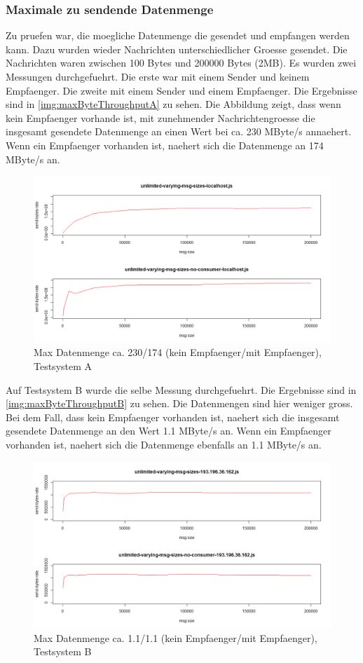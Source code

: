 \subsubsection{Maximale zu sendende Datenmenge}
\label{sec:maxthroughput}
Zu pruefen war, die moegliche Datenmenge die gesendet und empfangen werden kann. Dazu wurden wieder Nachrichten unterschiedlicher Groesse gesendet. Die Nachrichten waren zwischen 100 Bytes und 200000 Bytes (2MB). Es wurden zwei Messungen durchgefuehrt. Die erste war mit einem Sender und keinem Empfaenger. Die zweite mit einem Sender und einem Empfaenger. 
Die Ergebnisse sind in \autoref{img:maxByteThroughputA} zu sehen. Die Abbildung zeigt, dass wenn kein Empfaenger vorhande ist, mit zunehmender Nachrichtengroesse die insgesamt gesendete Datenmenge an einen Wert bei ca. 230 MByte/s annaehert. Wenn ein Empfaenger vorhanden ist, naehert sich die Datenmenge an 174 MByte/s an.
\begin{figure}
\center
  \includegraphics[width=1\textwidth]{images/max-byte-throughput-A.png}
  \caption{Max Datenmenge ca. 230/174 (kein Empfaenger/mit Empfaenger), Testsystem A}
  \label{img:maxByteThroughputA}
\end{figure}
Auf Testsystem B wurde die selbe Messung durchgefuehrt. 
Die Ergebnisse sind in \autoref{img:maxByteThroughputB} zu sehen. Die Datenmengen sind hier weniger gross. Bei dem Fall, dass kein Empfaenger vorhanden ist, naehert sich die  insgesamt gesendete Datenmenge an den Wert 1.1 MByte/s an. Wenn ein Empfaenger vorhanden ist, naehert sich die Datenmenge ebenfalls an 1.1 MByte/s an.
\begin{figure}
\center
  \includegraphics[width=1\textwidth]{images/max-byte-throughput-B.png}
  \caption{Max Datenmenge ca. 1.1/1.1 (kein Empfaenger/mit Empfaenger), Testsystem B}
  \label{img:maxByteThroughputB}
\end{figure}
